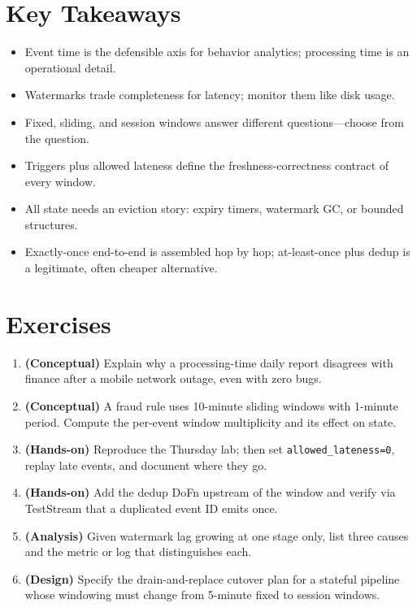 \section*{Key Takeaways}
\begin{itemize}
    \item Event time is the defensible axis for behavior analytics; processing time is an operational detail.
    \item Watermarks trade completeness for latency; monitor them like disk usage.
    \item Fixed, sliding, and session windows answer different questions---choose from the question.
    \item Triggers plus allowed lateness define the freshness-correctness contract of every window.
    \item All state needs an eviction story: expiry timers, watermark GC, or bounded structures.
    \item Exactly-once end-to-end is assembled hop by hop; at-least-once plus dedup is a legitimate, often cheaper alternative.
\end{itemize}

\section{Exercises}
\begin{enumerate}
    \item \textbf{(Conceptual)} Explain why a processing-time daily report disagrees with finance after a mobile network outage, even with zero bugs.
    \item \textbf{(Conceptual)} A fraud rule uses 10-minute sliding windows with 1-minute period. Compute the per-event window multiplicity and its effect on state.
    \item \textbf{(Hands-on)} Reproduce the Thursday lab; then set \texttt{allowed\_lateness=0}, replay late events, and document where they go.
    \item \textbf{(Hands-on)} Add the dedup DoFn upstream of the window and verify via TestStream that a duplicated event ID emits once.
    \item \textbf{(Analysis)} Given watermark lag growing at one stage only, list three causes and the metric or log that distinguishes each.
    \item \textbf{(Design)} Specify the drain-and-replace cutover plan for a stateful pipeline whose windowing must change from 5-minute fixed to session windows.
\end{enumerate}
